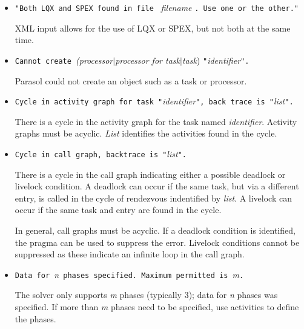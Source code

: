\begin{itemize}
\item \texttt{"Both LQX and SPEX found in file } \emph{filename}
  \texttt{.  Use one or the other."}

  XML input allows for the use of LQX or SPEX, but not both at the same time.
  
\item \texttt{Cannot create }\emph{(processor$|$processor for task$|$task})
  \texttt{"}\emph{identifier}\texttt{".}
  
  Parasol could not create an object such as a
  task or
  processor.

\item \texttt{Cycle in activity graph for task
    "}\emph{identifier}\texttt{", back trace is
    "}\emph{list}\texttt{".}
  
  There is a cycle in the activity graph for the task named
  \emph{identifier}.  Activity graphs
  must be acyclic.  \emph{List} identifies the activities found in the
  cycle.

\item \texttt{Cycle in call graph,  backtrace is "}\emph{list}\texttt{".}
  
  There is a cycle in the call graph
  indicating either a possible deadlock or livelock
  condition.  A deadlock can occur if the same task, but via a
  different entry, is called in the cycle of
  rendezvous indentified by \emph{list}.  A
  livelock can occur if the same task and entry are
  found in the cycle.

  In general, call graphs must be acyclic.  If a deadlock condition is
  identified, the  pragma can be used to suppress
  the error.  Livelock conditions cannot be suppressed as these
  indicate an infinite loop in the call graph.

\item \texttt{Data for }\emph{n}\texttt{ phases specified.  Maximum permitted is }\emph{m}\texttt{.}
  
  The solver only supports \emph{m} phases (typically
  3); data for \emph{n} phases was
  specified.  If more than \emph{m} phases need to be specified, use
  activities to define the phases.


\end{itemize}
